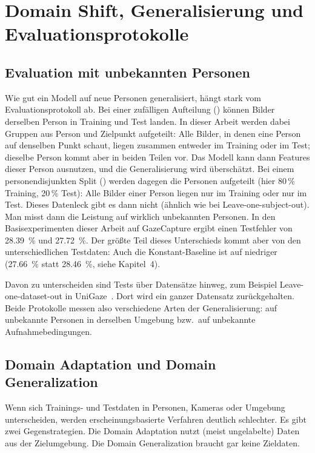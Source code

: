 \section{Domain Shift, Generalisierung und Evaluationsprotokolle}
\label{sec:domain_shift}
\subsection{Evaluation mit unbekannten Personen}
\label{subsec:norm_subject}
Wie gut ein Modell auf neue Personen generalisiert, hängt stark vom
Evaluationsprotokoll ab. Bei einer zufälligen Aufteilung
() können Bilder derselben Person in Training und Test
landen. In dieser Arbeit werden dabei Gruppen aus Person und Zielpunkt
aufgeteilt: Alle Bilder, in denen eine Person auf denselben Punkt schaut,
liegen zusammen entweder im Training oder im Test; dieselbe Person kommt aber
in beiden Teilen vor. Das Modell kann dann Features dieser Person ausnutzen, und die
Generalisierung wird überschätzt. Bei einem personendisjunkten Split
() werden dagegen die Personen aufgeteilt (hier 80\,\%
Training, 20\,\% Test): Alle Bilder einer Person liegen nur im Training oder
nur im Test. Dieses Datenleck gibt es dann nicht (ähnlich wie bei
Leave-one-subject-out). Man misst dann die Leistung auf wirklich unbekannten Personen. In den
Basisexperimenten dieser Arbeit auf GazeCapture ergibt 
einen Testfehler von \SI{28,39}{\percent} und 
\SI{27,72}{\percent}. Der größte Teil dieses Unterschieds kommt aber von den
unterschiedlichen Testdaten: Auch die Konstant-Baseline ist auf
 niedriger (\SI{27,66}{\percent} statt
\SI{28,46}{\percent}, siehe Kapitel~4).

Davon zu unterscheiden sind Tests über Datensätze hinweg, zum Beispiel
Leave-one-dataset-out in UniGaze~\cite{qin2026unigaze}. Dort wird ein ganzer
Datensatz zurückgehalten. Beide Protokolle messen also verschiedene Arten der
Generalisierung: auf unbekannte Personen in derselben Umgebung bzw.\ auf
unbekannte Aufnahmebedingungen.

\subsection{Domain Adaptation und Domain Generalization}
\label{subsec:domain_adaptation}
Wenn sich Trainings- und Testdaten in Personen, Kameras oder Umgebung
unterscheiden, werden erscheinungsbasierte Verfahren deutlich schlechter. Es
gibt zwei Gegenstrategien. Die Domain Adaptation nutzt (meist ungelabelte) Daten
aus der Zielumgebung. Die Domain Generalization braucht gar keine Zieldaten.


